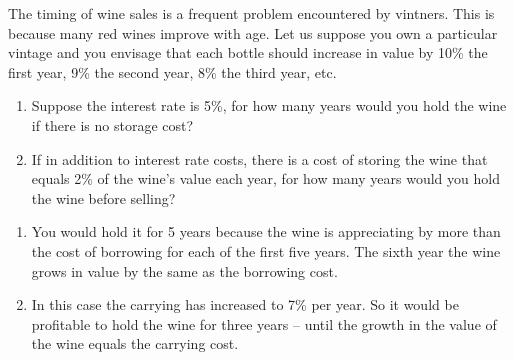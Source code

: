 \begin{enumialphparenastyle}
\begin{econex}
\begin{econsolution}
\end{econsolution}
\end{econex}

\begin{econex}\label{ex:ch12ex6}
The timing of wine sales is a frequent problem encountered by vintners. This is because many red wines improve with age. Let us suppose you own a particular vintage and you envisage that each bottle should increase in value by 10\% the first year, 9\% the second year, 8\% the third year, etc.
\begin{enumerate}
\item	Suppose the interest rate is 5\%, for how many years would you hold the wine if there is no storage cost?
\item	If in addition to interest rate costs, there is a cost of storing the wine that equals 2\% of the wine's value each year, for how many years would you hold the wine before selling?
\end{enumerate}
\begin{econsolution}
\begin{enumerate}
\item	You would hold it for 5 years because the wine is appreciating by more than the cost of borrowing for each of the first five years. The sixth year the wine grows in value by the same as the borrowing cost.
\item	In this case the carrying has increased to 7\% per year. So it would be profitable to hold the wine for three years -- until the growth in the value of the wine equals the carrying cost.
\end{enumerate}
\end{econsolution}
\end{econex}


\end{enumialphparenastyle}
